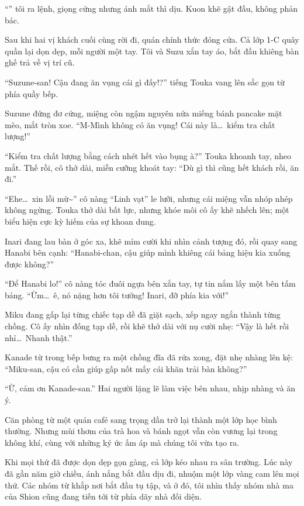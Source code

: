 \documentclass[../main.tex]{subfiles}
\begin{document}
``'' tôi ra lệnh, giọng cứng nhưng ánh mắt thì dịu. Kuon khẽ gật đầu, không phản bác.

Sau khi hai vị khách cuối cùng rời đi, quán chính thức đóng cửa. Cả lớp 1-C quây quần lại dọn dẹp, mỗi người một tay. Tôi và Suzu xắn tay áo, bắt đầu khiêng bàn ghế trả về vị trí cũ.

``Suzune-san! Cậu đang ăn vụng cái gì đấy!?'' tiếng Touka vang lên sắc gọn từ phía quầy bếp.

Suzune đứng đơ cứng, miệng còn ngậm nguyên nửa miếng bánh pancake mặt mèo, mắt tròn xoe. ``M-Mình không có ăn vụng! Cái này là\dots\ kiểm tra chất lượng!''

``Kiểm tra chất lượng bằng cách nhét hết vào bụng à?'' Touka khoanh tay, nheo mắt. Thế rồi, cô thở dài, miễn cưỡng khoát tay: ``Dù gì thì cũng hết khách rồi, ăn đi.''

``Ehe\dots\ xin lỗi mừ\~{}'' cô nàng ``Linh vạt'' le lưỡi, nhưng cái miệng vẫn nhóp nhép không ngừng. Touka thở dài bất lực, nhưng khóe môi cô ấy khẽ nhếch lên; một biểu hiện cực kỳ hiếm của sự khoan dung.

Inari đang lau bàn ở góc xa, khẽ mỉm cười khi nhìn cảnh tượng đó, rồi quay sang Hanabi bên cạnh: ``Hanabi-chan, cậu giúp mình khiêng cái bảng hiệu kia xuống được không?''

``Để Hanabi lo!'' cô nàng tóc đuôi ngựa bên xắn tay, tự tin nắm lấy một bên tấm bảng. ``Ừm\dots\ ê, nó nặng hơn tôi tưởng! Inari, đỡ phía kia với!''

Miku đang gấp lại từng chiếc tạp dề đã giặt sạch, xếp ngay ngắn thành từng chồng. Cô ấy nhìn đống tạp dề, rồi khẽ thở dài với nụ cười nhẹ: ``Vậy là hết rồi nhỉ\dots\ Nhanh thật.''

Kanade từ trong bếp bưng ra một chồng đĩa đã rửa xong, đặt nhẹ nhàng lên kệ: ``Miku-san, cậu có cần giúp gấp nốt mấy cái khăn trải bàn không?''

``Ừ, cảm ơn Kanade-san.'' Hai người lặng lẽ làm việc bên nhau, nhịp nhàng và ăn ý.

Căn phòng từ một quán café sang trọng dần trở lại thành một lớp học bình thường. Nhưng mùi thơm của trà hoa và bánh ngọt vẫn còn vương lại trong không khí, cùng với những ký ức ấm áp mà chúng tôi vừa tạo ra.

\ct

Khi mọi thứ đã được dọn dẹp gọn gàng, cả lớp kéo nhau ra sân trường. Lúc này đã gần năm giờ chiều, ánh nắng bắt đầu dịu đi, nhuộm một lớp vàng cam lên mọi thứ. Các nhóm từ khắp nơi bắt đầu tụ tập, và ở đó, tôi nhìn thấy nhóm nhà ma của Shion cũng đang tiến tới từ phía dãy nhà đối diện.
\end{document}
